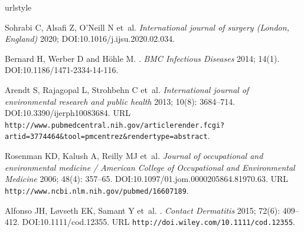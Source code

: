 \documentclass{article}
\begin{document}
\begin{thebibliography}{10}
  \providecommand{\url}[1]{\texttt{#1}}
  \providecommand{\urlprefix}{URL }
  \expandafter\ifx\csname urlstyle\endcsname\relax
    \providecommand{\doi}[1]{DOI:\discretionary{}{}{}#1}\else
    \providecommand{\doi}{DOI:\discretionary{}{}{}\begingroup
    \urlstyle{rm}\Url}\fi
  \providecommand{\eprint}[2][]{\url{#2}}
  
  Sohrabi C, Alsafi Z, O'Neill N et~al.
  \newblock \emph{International journal of surgery (London, England)} 2020;
    \doi{10.1016/j.ijsu.2020.02.034}.
  
  Bernard H, Werber D and H{\"{o}}hle M.
  .
  \newblock \emph{BMC Infectious Diseases} 2014; 14(1).
  \newblock \doi{10.1186/1471-2334-14-116}.
  
  Arendt S, Rajagopal L, Strohbehn C et~al.
  \newblock \emph{International journal of environmental research and public
    health} 2013; 10(8): 3684--714.
  \newblock \doi{10.3390/ijerph10083684}.
  \newblock
    \urlprefix\url{http://www.pubmedcentral.nih.gov/articlerender.fcgi?artid=3774464&tool=pmcentrez&rendertype=abstract}.
  
  Rosenman KD, Kalush A, Reilly MJ et~al.
  \newblock \emph{Journal of occupational and environmental medicine / American
    College of Occupational and Environmental Medicine} 2006; 48(4): 357--65.
  \newblock \doi{10.1097/01.jom.0000205864.81970.63}.
  \newblock \urlprefix\url{http://www.ncbi.nlm.nih.gov/pubmed/16607189}.
  
  Alfonso JH, L{\o}vseth EK, Samant Y et~al.
  .
  \newblock \emph{Contact Dermatitis} 2015; 72(6): 409--412.
  \newblock \doi{10.1111/cod.12355}.
  \newblock \urlprefix\url{http://doi.wiley.com/10.1111/cod.12355}.
  

\end{thebibliography}
\end{document}
